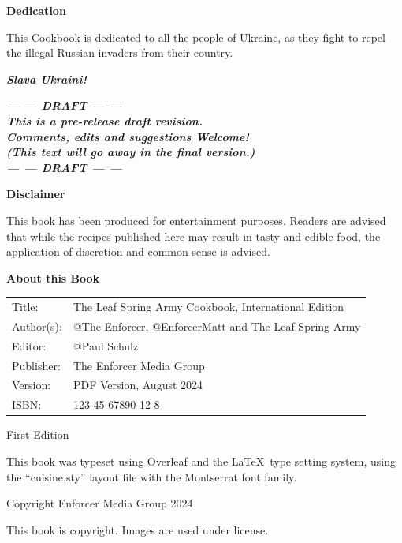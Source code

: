 \documentclass[11pt]{book}
\newcommand{\publishingdate}{August 2024}
\newcommand{\publishingversion}{PDF Version}
\newcommand{\isbn}{123-45-67890-12-8} %
\begin{document}
\restoregeometry
\nopagecolor

\newpage


\textbf{Dedication}

This Cookbook is dedicated to all the people of Ukraine, as they fight to repel the 
illegal Russian invaders from their country.

\textbf{\textit{Slava Ukraini!} \UKR}

\vfill
\begin{center}
\textbf{\textit{--- --- DRAFT --- --- \\
This is a pre-release draft revision. \\
Comments, edits and suggestions Welcome! \\
(This text will go away in the final version.) \\
--- --- DRAFT --- ---}}    
\end{center}

\vfill
\textbf{Disclaimer}

This book has been produced for entertainment purposes. Readers are advised that while the 
recipes published here may result in tasty and edible food, the application of
discretion and common sense is advised.

\vspace{5mm}
{\tiny
\textbf{About this Book}

\begin{tabular}{l l}
Title:     & The Leaf Spring Army Cookbook, International Edition \\
Author(s): & @The Enforcer, @EnforcerMatt and The Leaf Spring Army \\
Editor:    & @Paul Schulz \\
Publisher: & The Enforcer Media Group \\
Version:   & \publishingversion, \publishingdate \\
ISBN:      & \isbn \\
\end{tabular}

First Edition

This book was typeset using Overleaf and the \LaTeX\ type setting system, 
using the ``cuisine.sty'' layout file with the Montserrat font family.

Copyright \textcopyright Enforcer Media Group 2024 

This book is copyright. Images are used under license.
}

\clearpage
\end{document}
